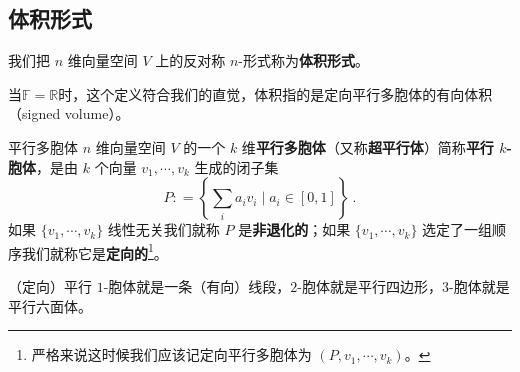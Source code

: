 
\begin{issues}
\issueTODO
\end{issues}


\subsection{体积形式}




我们把 $n$ 维向量空间 $V$ 上的反对称 $n$-形式称为\textbf{体积形式}。

当$\mathbb{F} = \mathbb{R}$时，这个定义符合我们的直觉，体积指的是定向平行多胞体的有向体积（signed volume）。

\begin{definition}{平行多胞体}
$n$ 维向量空间 $V$ 的一个 $k$ 维\textbf{平行多胞体}（又称\textbf{超平行体}）简称\textbf{平行 $k$-胞体}，是由 $k$ 个向量 $v_1, \cdots, v_k$ 生成的闭子集
\begin{equation}
P: = \left\{ \sum_i a_i v_i \mid a_i \in [0, 1] \right\}~.
\end{equation}
如果 $\{v_1, \cdots, v_k\}$ 线性无关我们就称 $P$ 是\textbf{非退化的}；如果 $\{v_1, \cdots, v_k\}$ 选定了一组顺序我们就称它是\textbf{定向的}\footnote{严格来说这时候我们应该记定向平行多胞体为 $(P, v_1, \cdots, v_k)$。}。
\end{definition}

\begin{example}{}
（定向）平行 $1$-胞体就是一条（有向）线段，$2$-胞体就是平行四边形，$3$-胞体就是平行六面体。
\end{example}

